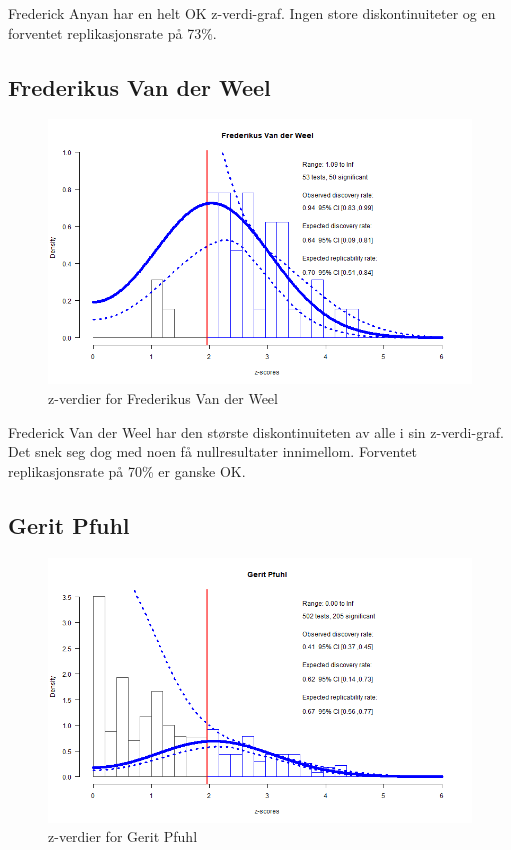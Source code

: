\documentclass[doc,norsk]{apa7}
\begin{document}
Frederick Anyan har en helt OK z-verdi-graf. Ingen store diskontinuiteter og en forventet replikasjonsrate på 73\%.

\subsection{Frederikus Van der Weel}
\begin{figure}[h!]
    \centering
    \includegraphics[width=\textwidth]{images/Frederikus Van der Weel.png}
    \caption{z-verdier for Frederikus Van der Weel}
\end{figure}

Frederick Van der Weel har den største diskontinuiteten av alle i sin z-verdi-graf. Det snek seg dog med noen få nullresultater innimellom. Forventet replikasjonsrate på 70\% er ganske OK.

\subsection{Gerit Pfuhl}
\begin{figure}[h!]
    \centering
    \includegraphics[width=\textwidth]{images/Gerit Pfuhl.png}
    \caption{z-verdier for Gerit Pfuhl}
\end{figure}
\end{document}
